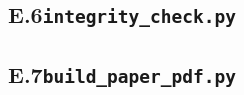 \documentclass[UTF8,zihao=5,a4paper]{ctexart}
\begin{document}
\subsection*{E.6\quad \texttt{integrity\_check.py}}

\subsection*{E.7\quad \texttt{build\_paper\_pdf.py}}

\end{document}
